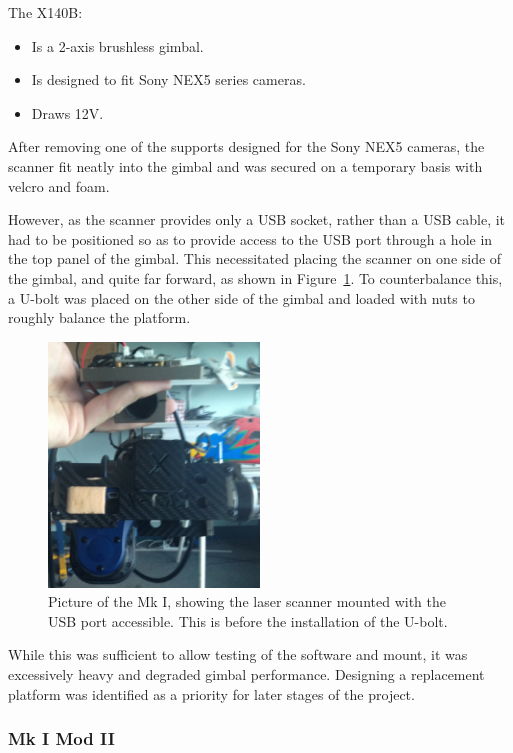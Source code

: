\documentclass[12pt,oneside,a4paper]{book}
\begin{document}
The X140B:
\begin{itemize}
\item Is a 2-axis brushless gimbal.
\item Is designed to fit Sony NEX5 series cameras.
\item Draws 12V.
\end{itemize}

After removing one of the supports designed for the Sony NEX5 cameras,
the scanner fit neatly into the gimbal and was secured on a temporary
basis with velcro and foam.

However, as the scanner provides only a USB socket, rather than a USB
cable, it had to be positioned so as to provide access to the USB port
through a hole in the top panel of the gimbal. This necessitated
placing the scanner on one side of the gimbal, and quite far forward,
as shown in Figure~\ref{fig:mk1-mount}. To counterbalance this, a
U-bolt was placed on the other side of the gimbal and loaded with nuts
to roughly balance the platform.

\begin{figure}[h!]
  \centering
  \includegraphics[width=0.5\textwidth]{figs/mk1-mount}
  \caption{Picture of the Mk I, showing the laser scanner mounted with the USB port accessible. This is before the installation of the U-bolt.}
  \label{fig:mk1-mount}
\end{figure}

While this was sufficient to allow testing of the software and mount,
it was excessively heavy and degraded gimbal performance. Designing a
replacement platform was identified as a priority for later stages of the project.
\newpage
\subsubsection{Mk I Mod II}
\label{sec:mk-ib}
\end{document}
